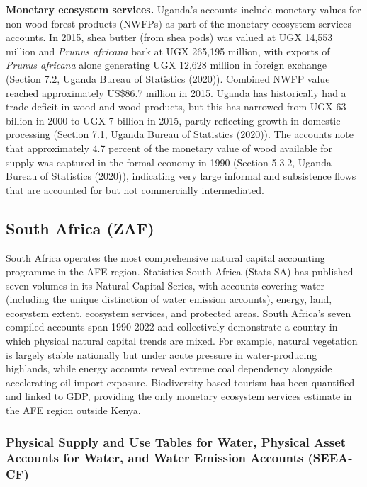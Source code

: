 \documentclass[
  letterpaper,
  DIV=11,
  numbers=noendperiod]{scrartcl}
\begin{document}
\textbf{Monetary ecosystem services.} Uganda's accounts include monetary
values for non-wood forest products (NWFPs) as part of the monetary
ecosystem services accounts. In 2015, shea butter (from shea pods) was
valued at UGX 14,553 million and \emph{Prunus africana} bark at UGX
265,195 million, with exports of \emph{Prunus africana} alone generating
UGX 12,628 million in foreign exchange (Section 7.2, Uganda Bureau of
Statistics (2020)). Combined NWFP value reached approximately US\$86.7
million in 2015. Uganda has historically had a trade deficit in wood and
wood products, but this has narrowed from UGX 63 billion in 2000 to UGX
7 billion in 2015, partly reflecting growth in domestic processing
(Section 7.1, Uganda Bureau of Statistics (2020)). The accounts note
that approximately 4.7 percent of the monetary value of wood available
for supply was captured in the formal economy in 1990 (Section 5.3.2,
Uganda Bureau of Statistics (2020)), indicating very large informal and
subsistence flows that are accounted for but not commercially
intermediated.

\subsection{South Africa (ZAF)}\label{sec-annex-zaf}

South Africa operates the most comprehensive natural capital accounting
programme in the AFE region. Statistics South Africa (Stats SA) has
published seven volumes in its Natural Capital Series, with accounts
covering water (including the unique distinction of water emission
accounts), energy, land, ecosystem extent, ecosystem services, and
protected areas. South Africa's seven compiled accounts span 1990-2022
and collectively demonstrate a country in which physical natural capital
trends are mixed. For example, natural vegetation is largely stable
nationally but under acute pressure in water-producing highlands, while
energy accounts reveal extreme coal dependency alongside accelerating
oil import exposure. Biodiversity-based tourism has been quantified and
linked to GDP, providing the only monetary ecosystem services estimate
in the AFE region outside Kenya.

\subsubsection{Physical Supply and Use Tables for Water, Physical Asset
Accounts for Water, and Water Emission Accounts
(SEEA-CF)}\label{physical-supply-and-use-tables-for-water-physical-asset-accounts-for-water-and-water-emission-accounts-seea-cf}
\end{document}
